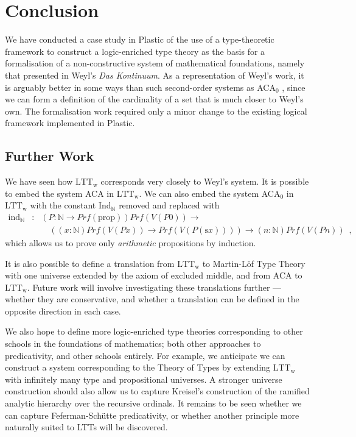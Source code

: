 \documentclass[acmtocl]{acmtrans2m}
\newcommand{\LTTW}{\ensuremath{\mathrm{LTT}_\mathrm{w}}}
\newcommand{\Prf}[1]{Prf \left( {#1} \right)}
\newcommand{\s}{\mathrm{s}}
\newcommand{\IN}{\mathrm{Ind}_\mathbb{N}}
\newcommand{\p}{\mathrm{prop}}
\begin{document}
\section{Conclusion}

We have conducted a case study in Plastic of the use of a type-theoretic
framework to construct a logic-enriched type theory as the basis for
a formalisation of a non-constructive system of mathematical
foundations, namely that presented in Weyl's \textit{Das Kontinuum}.
As a representation of Weyl's work, it is arguably better in some
ways than such second-order systems as ACA$_0$
\cite{feferman:kontinuum}, since we can form a definition of the
cardinality of a set that is much closer to Weyl's own.  The
formalisation work required only a minor change to the existing
logical framework implemented in Plastic.

\subsection{Further Work}

We have seen how $\LTTW$ corresponds very closely to Weyl's system.  It is possible to embed the system ACA in $\LTTW$. We can also embed the system ACA$_0$ in $\LTTW$ with the constant $\IN$ removed and replaced with
\begin{eqnarray*}
\mathrm{ind}_\mathbb{N} & : & (P : \mathbb{N} \rightarrow \Prf{\p}) \Prf{V(P0)} \rightarrow  \\
& & \quad ((x:\mathbb{N})\Prf{V(Px)} \rightarrow \Prf{V(P(\s x))}) \rightarrow (n : \mathbb{N}) \Prf{V(Pn)} \enspace ,
\end{eqnarray*}
which allows us to prove only \emph{arithmetic} propositions by induction.

It is also possible to define a translation from $\LTTW$ to Martin-L\"of Type Theory with one universe extended by the axiom of excluded middle, and from ACA to $\LTTW$.
Future work will involve investigating these translations further --- whether they are conservative, and whether a translation can be defined in the opposite direction in each case.

We also hope to define more logic-enriched type theories corresponding to other schools in the foundations of mathematics; both other approaches to predicativity, and other schools entirely.  For example, we anticipate we can construct a system corresponding to the Theory of Types by extending $\LTTW$ with infinitely many type and propositional universes.  A stronger universe construction should also allow us to capture Kreisel's construction of the ramified analytic hierarchy over the recursive ordinals.  It remains to be seen whether we can capture Feferman-Sch\"utte predicativity, or whether another principle more naturally suited to LTTs will be discovered.
\end{document}
